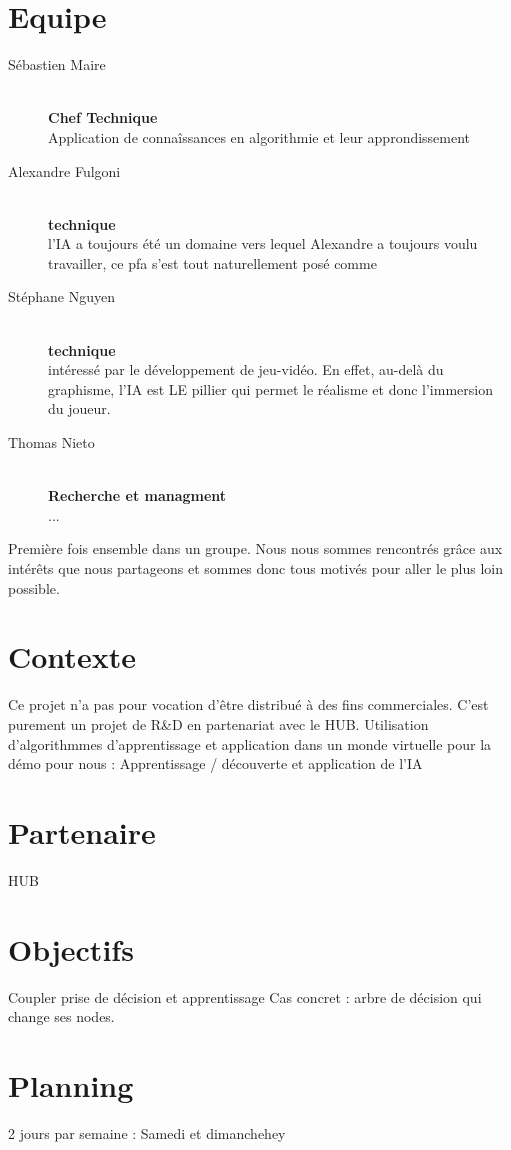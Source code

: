 \documentclass{article}
\begin{document}
\section{Equipe}
  \begin{description}
    \item[Sébastien Maire] \hfill \\
      \textbf{Chef Technique} \\
      Application de connaîssances
      en algorithmie et leur approndissement
    \item[Alexandre Fulgoni] \hfill \\
      \textbf{technique} \\
      l’IA a toujours été un domaine vers lequel Alexandre a
      toujours voulu travailler, ce pfa s’est tout naturellement posé
      comme
    \item[Stéphane Nguyen] \hfill \\
      \textbf{technique} \\
      intéressé par le développement de jeu-vidéo. En effet,
      au-delà du graphisme, l’IA est LE pillier qui permet le réalisme
      et donc l’immersion du joueur.
    \item[Thomas Nieto] \hfill \\
      \textbf{Recherche et managment} \\
      ...
  \end{description}

  Première fois ensemble dans un groupe. Nous nous sommes rencontrés grâce aux
  intérêts que nous partageons et sommes donc tous motivés pour aller le plus
  loin possible.

\section{Contexte}
  Ce projet n’a pas pour vocation d’être distribué à des fins commerciales.
  C’est purement un
  projet de R\&D en partenariat avec le HUB.
  Utilisation d’algorithmmes d’apprentissage et application dans un monde
  virtuelle pour la démo pour nous : Apprentissage / découverte et
  application de l’IA

\section{Partenaire}
  HUB

\section{Objectifs}
  Coupler prise de décision et apprentissage
  Cas concret : arbre de décision qui change ses nodes.


\section{Planning}
  2 jours par semaine : Samedi et dimanchehey
\end{document}

